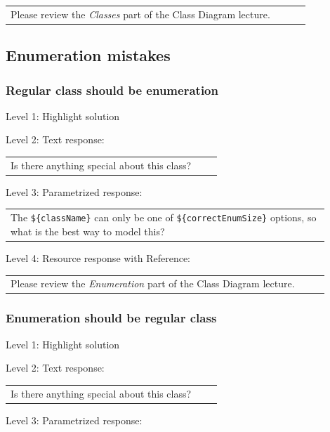 \begin{tabular}{|p{0.9\linewidth}}
Please review the \textit{Classes} part of the Class Diagram lecture.
\end{tabular} \medskip


\subsection{Enumeration mistakes}

\subsubsection{Regular class should be enumeration}

\noindent Level 1: Highlight solution  \medskip

\noindent Level 2: Text response: \medskip

\begin{tabular}{|p{0.9\linewidth}}
Is there anything special about this class?
\end{tabular} \medskip

\noindent Level 3: Parametrized response: \medskip

\begin{tabular}{|p{0.9\linewidth}}
The \verb|${className}| can only be one of \verb|${correctEnumSize}| options, so what is the best way to model this?
\end{tabular} \medskip

\noindent Level 4: Resource response with Reference: \medskip

\begin{tabular}{|p{0.9\linewidth}}
Please review the \textit{Enumeration} part of the Class Diagram lecture.
\end{tabular} \medskip


\subsubsection{Enumeration should be regular class}

\noindent Level 1: Highlight solution  \medskip

\noindent Level 2: Text response: \medskip

\begin{tabular}{|p{0.9\linewidth}}
Is there anything special about this class?
\end{tabular} \medskip

\noindent Level 3: Parametrized response: \medskip


